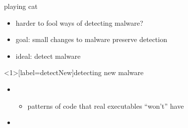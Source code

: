 
\begin{frame}{playing cat}
    \begin{itemize}
    \item harder to fool ways of detecting malware?
    \item goal: small changes to malware preserve detection
    \item ideal: detect  malware
    \end{itemize}
\end{frame}

\begin{frame}<1>[label=detectNew]{detecting new malware}
    \begin{itemize}
    \item {}
        \begin{itemize}
        \item patterns of code that real executables ``won't'' have
        \end{itemize}
    \item {}
    \end{itemize}
\end{frame}


